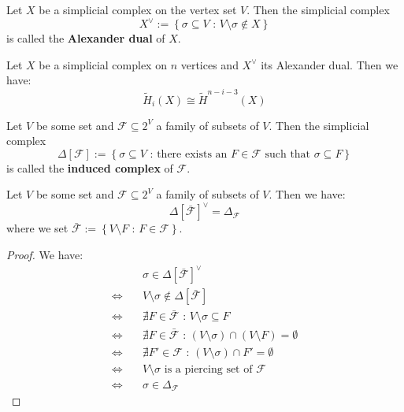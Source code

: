 \begin{defi}
Let \(X\) be a simplicial complex on the vertex set \(V\). Then the simplicial complex
\[
X^{\lor}:=\left\{\sigma\subseteq V\text{ : }V\setminus\sigma\notin X\right\}
\]
is called the \textbf{Alexander dual} of \(X\).
\end{defi}

\begin{thm}\label{theorem12}
Let \(X\) be a simplicial complex on \(n\) vertices and \(X^{\lor}\) its Alexander dual. Then we have:
\[
\tilde{H}_i(X)\cong\tilde{H}^{n-i-3}(X)
\]
\end{thm}

\begin{defi}
Let \(V\) be some set and \(\mathcal{F}\subseteq 2^V\) a family of subsets of \(V\). Then the simplicial complex
\[
\Delta\left[\mathcal{F}\right]:=\left\{\sigma\subseteq V\text{ : there exists an }F\in\mathcal{F}\text{ such that }\sigma\subseteq F\right\}
\]
is called the \textbf{induced complex} of \(\mathcal{F}\). 
\end{defi}

\begin{prop}\label{proposition13}
Let \(V\) be some set and \(\mathcal{F}\subseteq 2^V\) a family of subsets of \(V\). Then we have:
\[
\Delta\left[\bar{\mathcal{F}}\right]^{\lor}=\Delta_{\mathcal{F}}
\]
where we set \(\bar{\mathcal{F}}:=\left\{V\setminus F\text{ : }F\in\mathcal{F}\right\}\).
\begin{proof}
We have:
\begin{align*}
  & \sigma\in\Delta\left[\bar{\mathcal{F}}\right]^{\lor} \\
  \Longleftrightarrow \quad & V\setminus\sigma\notin\Delta\left[\bar{\mathcal{F}}\right] \\
  \Longleftrightarrow \quad & \nexists F\in\bar{\mathcal{F}}\text{ : }V\setminus\sigma\subseteq F \\
  \Longleftrightarrow \quad & \nexists F\in\bar{\mathcal{F}}\text{ : }(V\setminus\sigma)\cap(V\setminus F)=\emptyset \\
  \Longleftrightarrow \quad & \nexists F'\in\mathcal{F}\text{ : }(V\setminus\sigma)\cap F'=\emptyset \\
  \Longleftrightarrow \quad & V\setminus\sigma\text{ is a piercing set of }\mathcal{F} \\
  \Longleftrightarrow \quad & \sigma\in\Delta_{\mathcal{F}}
 \end{align*}
\end{proof}
\end{prop}

